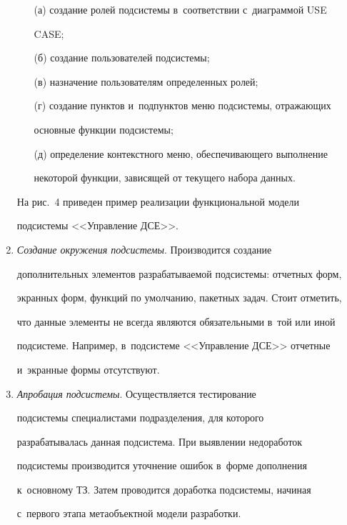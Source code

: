 \begin{enumerate}[1.]
\begin{itemize}

\item[(а)] создание ролей подсистемы в~соответствии с~диаграммой USE 

CASE;

\item[(б)]создание пользователей подсистемы;

\item[(в)]назначение пользователям определенных ролей;

\item[(г)]создание пунктов и~подпунктов меню подсистемы, отражающих 

основные функции подсистемы;

\item[(д)]определение контекстного меню, обеспечивающего выполнение 

некоторой функции, зависящей от текущего набора данных. 

\end{itemize}



 На рис.~4 приведен пример реализации функциональной модели 

подсистемы <<Управление ДСЕ>>. 

\item \textit{Создание окружения подсистемы}. Производится создание 

дополнительных элементов разрабатываемой подсистемы: отчетных форм, 

экранных форм, функций по умолчанию, пакетных задач. Стоит отметить, 

что данные элементы не всегда являются обязательными в~той или иной 

подсистеме. Например, в~подсистеме <<Управление ДСЕ>> отчетные 

и~экранные формы отсутствуют.

\item \textit{Апробация подсистемы}. Осуществляется тестирование 

подсистемы специалистами подразделения, для которого 

разрабатывалась данная подсистема. При выявлении недоработок 

подсистемы производится уточнение ошибок в~форме дополнения 

к~основному ТЗ. Затем проводится доработка подсистемы, начиная 

с~первого этапа метаобъектной модели разработки.

\end{enumerate}



